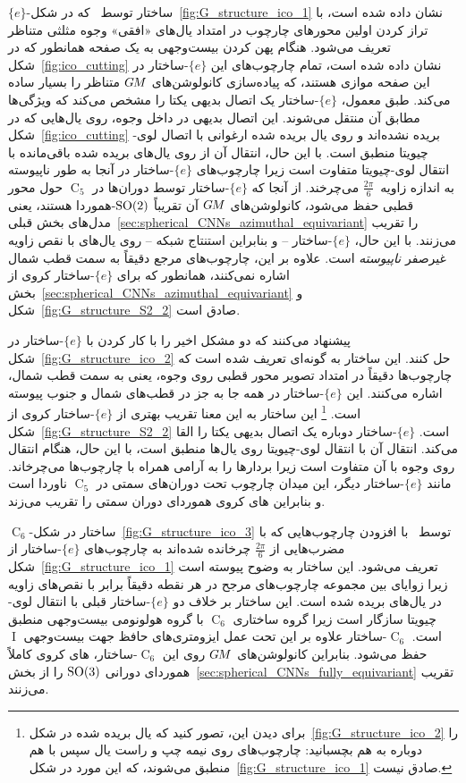 $\{e\}$-ساختار توسط~\citet{liu2018icoAltAz} که در شکل~\ref{fig:G_structure_ico_1} نشان داده شده است، با تراز کردن اولین محورهای چارچوب در امتداد یال‌های «افقی» وجوه مثلثی متناظر تعریف می‌شود.
هنگام پهن کردن بیست‌وجهی به یک صفحه همانطور که در شکل~\ref{fig:ico_cutting} نشان داده شده است، تمام چارچوب‌های این $\{e\}$-ساختار در این صفحه موازی هستند، که پیاده‌سازی کانولوشن‌های $G\mkern-1.4muM$ متناظر را بسیار ساده می‌کند.
طبق معمول، $\{e\}$-ساختار یک اتصال بدیهی یکتا را مشخص می‌کند که ویژگی‌ها مطابق آن منتقل می‌شوند.
این اتصال بدیهی در داخل وجوه، روی یال‌هایی که در شکل~\ref{fig:ico_cutting} بریده نشده‌اند و روی یال بریده شده ارغوانی با اتصال لوی-چیویتا منطبق است.
با این حال، انتقال آن از روی یال‌های بریده شده باقی‌مانده با انتقال لوی-چیویتا متفاوت است زیرا چارچوب‌های $\{e\}$-ساختار در آنجا به طور ناپیوسته به اندازه زاویه~$\frac{2\pi}{6}$ می‌چرخند.
از آنجا که $\{e\}$-ساختار توسط دوران‌ها در $\operatorname{C}_5$ حول محور قطبی حفظ می‌شود، کانولوشن‌های $G\mkern-1.4muM$ آن تقریباً $\operatorname{SO}(2)$-هموردا هستند، یعنی مدل‌های بخش قبلی~\ref{sec:spherical_CNNs_azimuthal_equivariant} را تقریب می‌زنند.
با این حال، $\{e\}$-ساختار -- و بنابراین استنتاج شبکه -- روی یال‌های با نقص زاویه غیرصفر \emph{ناپیوسته} است.
علاوه بر این، چارچوب‌های مرجع دقیقاً به سمت قطب شمال اشاره نمی‌کنند، همانطور که برای $\{e\}$-ساختار کروی از بخش~\ref{sec:spherical_CNNs_azimuthal_equivariant} و شکل~\ref{fig:G_structure_S2_2} صادق است.


\citet{zhang2019orientation} پیشنهاد می‌کنند که دو مشکل اخیر را با کار کردن با $\{e\}$-ساختار در شکل~\ref{fig:G_structure_ico_2} حل کنند.
این ساختار به گونه‌ای تعریف شده است که چارچوب‌ها دقیقاً در امتداد تصویر محور قطبی روی وجوه، یعنی به سمت قطب شمال، اشاره می‌کنند.
این $\{e\}$-ساختار در همه جا به جز در قطب‌های شمال و جنوب پیوسته است.%
\footnote{
	برای دیدن این، تصور کنید که یال بریده شده در شکل~\ref{fig:G_structure_ico_2} را دوباره به هم بچسبانید:
	چارچوب‌های روی نیمه چپ و راست یال سپس با هم منطبق می‌شوند، که این مورد در شکل~\ref{fig:G_structure_ico_1} صادق نیست.
}
این ساختار به این معنا تقریب بهتری از $\{e\}$-ساختار کروی از شکل~\ref{fig:G_structure_S2_2} است.
$\{e\}$-ساختار دوباره یک اتصال بدیهی یکتا را القا می‌کند.
انتقال آن با انتقال لوی-چیویتا روی یال‌ها منطبق است، با این حال، هنگام انتقال روی وجوه با آن متفاوت است زیرا بردارها را به آرامی همراه با چارچوب‌ها می‌چرخاند.
مانند $\{e\}$-ساختار دیگر، این میدان چارچوب تحت دوران‌های سمتی در $\operatorname{C}_5$ ناوردا است و بنابراین های کروی هموردای دوران سمتی را تقریب می‌زند.


$\operatorname{C}_6$-ساختار در شکل~\ref{fig:G_structure_ico_3} توسط~\citet{gaugeIco2019} با افزودن چارچوب‌هایی که با مضرب‌هایی از $\frac{2\pi}{6}$ چرخانده شده‌اند به چارچوب‌های $\{e\}$-ساختار از شکل~\ref{fig:G_structure_ico_1} تعریف می‌شود.
این ساختار به وضوح پیوسته است زیرا زوایای بین مجموعه چارچوب‌های مرجح در هر نقطه دقیقاً برابر با نقص‌های زاویه در یال‌های بریده شده است.
این ساختار بر خلاف دو $\{e\}$-ساختار قبلی با انتقال لوی-چیویتا سازگار است زیرا گروه ساختاری $\operatorname{C}_6$ با گروه هولونومی بیست‌وجهی منطبق است.
$\operatorname{C}_6$-ساختار علاوه بر این تحت عمل ایزومتری‌های حافظ جهت بیست‌وجهی $\operatorname{I}$ حفظ می‌شود.
بنابراین کانولوشن‌های $G\mkern-1.4muM$ روی این $\operatorname{C}_6$-ساختار، های کروی کاملاً هموردای دورانی $\operatorname{SO}(3)$ را از بخش~\ref{sec:spherical_CNNs_fully_equivariant} تقریب می‌زنند.

